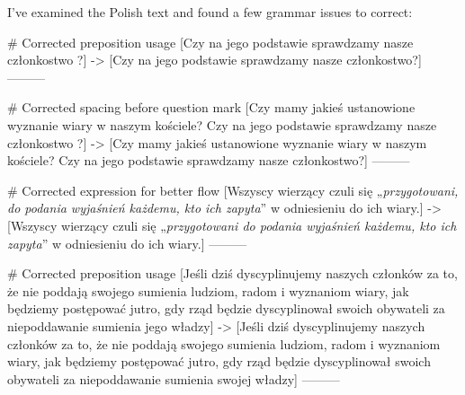 I've examined the Polish text and found a few grammar issues to correct:

# Corrected preposition usage
[Czy na jego podstawie sprawdzamy nasze członkostwo ?]
->
[Czy na jego podstawie sprawdzamy nasze członkostwo?]
---------

# Corrected spacing before question mark
[Czy mamy jakieś ustanowione wyznanie wiary w naszym kościele? Czy na jego podstawie sprawdzamy nasze członkostwo ?]
->
[Czy mamy jakieś ustanowione wyznanie wiary w naszym kościele? Czy na jego podstawie sprawdzamy nasze członkostwo?]
---------

# Corrected expression for better flow
[Wszyscy wierzący czuli się „\textit{przygotowani, do podania wyjaśnień każdemu, kto ich zapyta}” w odniesieniu do ich wiary.]
->
[Wszyscy wierzący czuli się „\textit{przygotowani do podania wyjaśnień każdemu, kto ich zapyta}” w odniesieniu do ich wiary.]
---------

# Corrected preposition usage
[Jeśli dziś dyscyplinujemy naszych członków za to, że nie poddają swojego sumienia ludziom, radom i wyznaniom wiary, jak będziemy postępować jutro, gdy rząd będzie dyscyplinował swoich obywateli za niepoddawanie sumienia jego władzy]
->
[Jeśli dziś dyscyplinujemy naszych członków za to, że nie poddają swojego sumienia ludziom, radom i wyznaniom wiary, jak będziemy postępować jutro, gdy rząd będzie dyscyplinował swoich obywateli za niepoddawanie sumienia swojej władzy]
---------